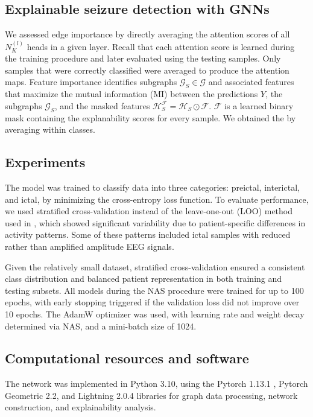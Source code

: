 \documentclass[a4paper,fleqn]{cas-sc}
\begin{document}
\subsection{Explainable seizure detection with GNNs}
We assessed edge importance by directly averaging the attention scores of all $N_K^{(l)}$ heads in a given layer. Recall that each attention score is learned during the training procedure and later evaluated using the testing samples. Only samples that were correctly classified were averaged to produce the attention maps. Feature importance identifies subgraphs $\mathcal{G}_{S} \in \mathcal{G}$ and associated features that maximize the mutual information (MI) between the predictions $Y$, the subgraphs $\mathcal{G}_S$, and the masked features $\mathcal{H}_{S}^\mathcal{F} = \mathcal{H}_{S} \odot \mathcal{F}$. $\mathcal{F}$ is a learned binary mask containing the explanability scores for every sample. We obtained the by averaging within classes. 

\subsection{Experiments}
The model was trained to classify data into three categories: preictal, interictal, and ictal, by minimizing the cross-entropy loss function. To evaluate performance, we used stratified cross-validation instead of the leave-one-out (LOO) method used in \cite{MazurekPreprocessing}, which showed significant variability due to patient-specific differences in activity patterns. Some of these patterns included ictal samples with reduced rather than amplified amplitude EEG signals.

Given the relatively small dataset, stratified cross-validation ensured a consistent class distribution and balanced patient representation in both training and testing subsets. All models during the NAS procedure were trained for up to 100 epochs, with early stopping triggered if the validation loss did not improve over 10 epochs. The AdamW optimizer \cite{LoshchilovAdam} was used, with learning rate and weight decay determined via NAS, and a mini-batch size of 1024.

\subsection{Computational resources and software}
The network was implemented in Python 3.10, using the Pytorch 1.13.1 \cite{PaszkeTorch}, Pytorch Geometric 2.2, and Lightning 2.0.4 \cite{falcon2019lightning} libraries \cite{FeyPytorchGeometric} for graph data processing, network construction, and explainability analysis.
\end{document}
